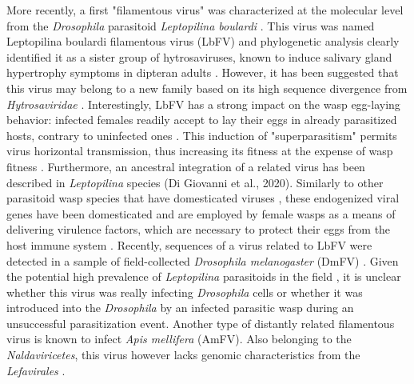 More recently, a first "filamentous virus" was characterized at the molecular level from the \textit{Drosophila} parasitoid \textit{Leptopilina boulardi} \citep{lepetit_genome_2017}. This virus was named Leptopilina boulardi filamentous virus (LbFV) and phylogenetic analysis clearly identified it as a sister group of hytrosaviruses, known to induce salivary gland hypertrophy symptoms in dipteran adults \citep{abd-alla_hytrosaviridae_2009}. However, it has been suggested that this virus may belong to a new family based on its high sequence divergence from \textit{Hytrosaviridae} \citep{lepetit_genome_2017}. Interestingly, LbFV has a strong impact on the wasp egg-laying behavior: infected females readily accept to lay their eggs in already parasitized hosts, contrary to uninfected ones \citep{varaldi_infectious_2003,varaldi_artifical_2006}. This induction of "superparasitism" permits virus horizontal transmission, thus increasing its fitness at the expense of wasp fitness \citep{gandon_superparasitism_2006}. Furthermore, an ancestral integration of a related virus has been described in \textit{Leptopilina} species (Di Giovanni et al., 2020). Similarly to other parasitoid wasp species that have domesticated viruses \citep{bezier_polydnaviruses_2009,volkoff_analysis_2010,pichon_recurrent_2015, burke_common_2019}, these endogenized viral genes have been domesticated and are employed by female wasps as a means of delivering virulence factors, which are necessary to protect their eggs from the host immune system \citep{rizki_parasitoid_1990, di_giovanni_behavior-manipulating_2020}. Recently, sequences of a virus related to LbFV were detected in a sample of field-collected \textit{Drosophila melanogaster} (DmFV) \citep{wallace_discovery_2021}. Given the potential high prevalence of \textit{Leptopilina} parasitoids in the field \citep{patot_prevalence_2010}, it is unclear whether this virus was really infecting \textit{Drosophila} cells or whether it was introduced into the \textit{Drosophila} by an infected parasitic wasp during an unsuccessful parasitization event. Another type of distantly related filamentous virus is known to infect \textit{Apis mellifera} (AmFV). Also belonging to the \textit{Naldaviricetes}, this virus however lacks genomic characteristics from the \textit{Lefavirales} \citep{gauthier_apis_2015, yang_genomics_2022}. 

